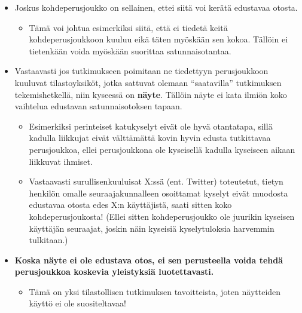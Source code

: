 \documentclass[
]{book}
\providecommand{\tightlist}{%
  \setlength{\itemsep}{0pt}\setlength{\parskip}{0pt}}
\begin{document}
\begin{itemize}
\tightlist
\item
  Joskus kohdeperusjoukko on sellainen, ettei siitä voi kerätä edustavaa otosta.

  \begin{itemize}
  \tightlist
  \item
    Tämä voi johtua esimerkiksi siitä, että ei tiedetä keitä kohdeperusjoukkoon kuuluu eikä täten myöskään sen kokoa. Tällöin ei tietenkään voida myöskään suorittaa satunnaisotantaa.
  \end{itemize}
\item
  Vastaavasti jos tutkimukseen poimitaan ne tiedettyyn perusjoukkoon kuuluvat tilastoyksiköt, jotka sattuvat olemaan ``saatavilla'' tutkimuksen tekemishetkellä, niin kyseessä on \textbf{näyte}. Tällöin näyte ei kata ilmiön koko vaihtelua edustavan satunnaisotoksen tapaan.

  \begin{itemize}
  \tightlist
  \item
    Esimerkiksi perinteiset katukyselyt eivät ole hyvä otantatapa, sillä kadulla liikkujat eivät välttämättä kovin hyvin edusta tutkittavaa perusjoukkoa, ellei perusjoukkona ole kyseisellä kadulla kyseiseen aikaan liikkuvat ihmiset.
  \item
    Vastaavasti surullisenkuuluisat X:ssä (ent. Twitter) toteutetut, tietyn henkilön omalle seuraajakunnalleen osoittamat kyselyt eivät muodosta edustavaa otosta edes X:n käyttäjistä, saati sitten koko kohdeperusjoukosta! (Ellei sitten kohdeperusjoukko ole juurikin kyseisen käyttäjän seuraajat, joskin näin kyseisiä kyselytuloksia harvemmin tulkitaan.)
  \end{itemize}
\item
  \textbf{Koska näyte ei ole edustava otos, ei sen perusteella voida tehdä perusjoukkoa koskevia yleistyksiä luotettavasti.}

  \begin{itemize}
  \tightlist
  \item
    Tämä on yksi tilastollisen tutkimuksen tavoitteista, joten näytteiden käyttö ei ole suositeltavaa!
  \end{itemize}
\end{itemize}
\end{document}
